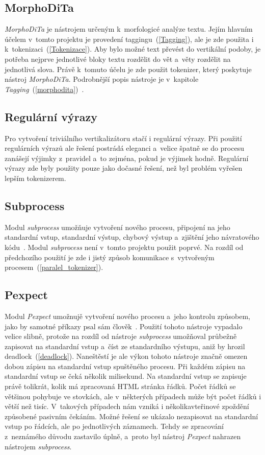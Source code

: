 \subsection{MorphoDiTa}
\textit{MorphoDiTa} je nástrojem určeným k~morfologicé analýze textu. Jejím hlavním účelem v~tomto projektu je
provedení taggingu~(\ref{Tagging}), ale je zde použita i k~tokenizaci~(\ref{Tokenizace}).
Aby bylo možné text převést do vertikální podoby, je potřeba nejprve jednotlivé bloky
textu rozdělit do vět a~věty rozdělit na jednotlivá slova. Právě k~tomuto účelu
je zde použit tokenizer, který poskytuje nástroj \textit{MorphoDiTa}.
Podrobnější popis nástroje je v~kapitole \textit{Tagging}~(\ref{morphodita})~\cite{MORPHODITA}.

\subsection{Regulární výrazy}
Pro vytvoření triviálního vertikalizátoru stačí i regulární výrazy. Při použití regulárních
výrazů ale řešení postrádá eleganci a~velice špatně se do procesu zanášejí výjimky z~pravidel
a~to zejména, pokud je výjimek hodně. Regulární výrazy zde byly použity pouze jako dočasné
řešení, než byl problém vyřešen lepším tokenizerem.

\subsection{Subprocess}
\label{subprocess}
Modul \textit{subprocess} umožňuje vytvoření nového procesu, připojení na jeho standardní vstup,
standardní výstup, chybový výstup a~zjištění jeho návratového kódu~\cite{SUBPROCESS}.
Modul \textit{subprocess} není v~tomto projektu použit poprvé. Na rozdíl od předchozího použití
je zde i jistý způsob komunikace s~vytvořeným procesem~(\ref{paralel_tokenizer}).

\subsection{Pexpect}
\label{pexpect}
Modul \textit{Pexpect} umožnujě vytvoření nového procesu a~jeho kontrolu způsobem,
jako by samotné příkazy psal sám člověk~\cite{PEXPECT}. Použití tohoto nástroje
vypadalo velice slibně, protože na rozdíl od nástroje \textit{subprocess} umožňoval průbežně
zapisovat na standardní vstup a~číst ze standardního výstupu, aniž by hrozil deadlock~(\ref{deadlock}).
Naneštěstí je ale výkon tohoto nástroje značně omezen dobou zápisu na standardní vstup
spuštěného procesu. Při každém zápisu na standardní vstup se čeká několik milisekund.
Na standardní vstup se zapisuje právě tolikrát, kolik má zpracovaná HTML stránka řádků.
Počet řádků se většinou pohybuje ve stovkách, ale v~některých případech může být počet řádků
i větší než tisíc. V~takových případech nám vzniká i několikavteřinové zpoždění způsobené
pasivním čekáním. Možné řešení se ukázalo nezapisovat na standardní vstup po řádcích, ale
po jednotlivých záznamech. Tehdy se zpracování z~neznámého důvodu zastavilo úplně, a~proto
byl nástroj \textit{Pexpect} nahrazen nástrojem \textit{subprocess}.

